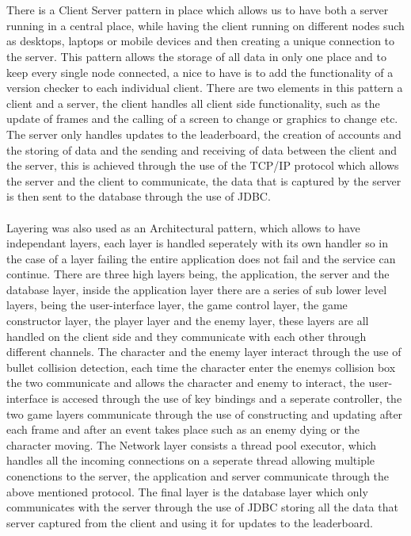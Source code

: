 \documentclass[letterpaper]{article}
\begin{document}
		\section*{\colorbox{blue}{}}
		\vspace{0.1in}
		There is a Client Server pattern in place	which allows us to have both a server running in a central place, while having the client running on different nodes such as desktops, laptops or mobile devices and then creating a unique connection to the server. This pattern allows the storage of all data in only one place and to keep every single node connected, a nice to have is to add the functionality of a version checker to each individual client. There are two elements in this pattern a client and a server, the client handles all client side functionality, such as the update of frames and the calling of a screen to change or graphics to change etc. The server only handles updates to the leaderboard, the creation of accounts and the storing of data and the sending and receiving of data between the client and the server, this is achieved through the use of the TCP/IP protocol which allows the server and the client to communicate, the data that is captured by the server is then sent to the database through the use of JDBC. \\
		\vspace{0.1in}
		\\
		Layering was also used as an Architectural pattern, which allows to have independant layers, each layer is handled seperately with its own handler so in the case of a layer failing the entire application does not fail and the service can continue. There are three high layers being, the application, the server and the database layer, inside the application layer there are a series of sub lower level layers, being the user-interface layer, the game control layer, the game constructor layer, the player layer and the enemy layer, these layers are all handled on the client side and they communicate with each other through different channels. The character and the enemy layer interact through the use of bullet collision detection, each time the character enter the enemys collision box the two communicate and allows the character and enemy to interact, the user-interface is accesed through the use of key bindings and a seperate controller, the two game layers communicate through the use of constructing and updating after each frame and after an event takes place such as an enemy dying or the character moving. The Network layer consists a thread pool executor, which handles all the incoming connections on a seperate thread allowing multiple conenctions to the server, the application and server communicate through the above mentioned protocol. The final layer is the database layer which only communicates with the server through the use of JDBC storing all the data that server captured from the client and using it for updates to the leaderboard.
		\vspace{0.2in}
\end{document}
